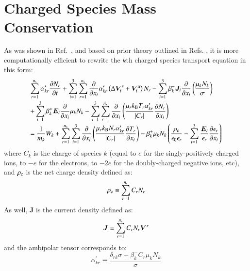 \documentclass{warpdoc}
\newcommand{\alb}{\vspace{0.1cm}\\} %
\newcommand{\mfd}{\displaystyle}
\newcommand{\ns}{{n_{\rm s}}}
\renewcommand{\vec}[1]{\bm{#1}}
\begin{document}
\section{Charged Species Mass Conservation}

As was shown in Ref.\ \cite{jcp:2015:parent}, and based on prior theory outlined in Refs. \cite{jcp:2014:parent,jcp:2011:parent:2, jcp:2013:parent}, it is more computationally efficient to rewrite the $k$th charged species transport equation in this form:
%
\begin{equation}
\begin{array}{l}\mfd
  \sum_{r=1}^{\ns} \alpha^\prime_{kr} \frac{\partial N_r}{\partial t}  
+ \sum_{i=1}^3 \sum_{r=1}^\ns  \frac{\partial}{\partial x_i}      \alpha^\prime_{kr} \left( \Delta \vec{V}_i^r + \vec{V}^{\rm n}_i \right)N_r
-  \sum_{i=1}^3 \beta_k^- \vec{J}_i \frac{\partial}{\partial x_i}  \left( \frac{\mu_k N_k}{\sigma} 
\right) \alb\mfd
+ \sum_{i=1}^3 \beta_k^+ \vec{E}_i \frac{\partial }{\partial x_i} \mu_{k} N_{k}
- \sum_{i=1}^3 \sum_{r=1}^{\ns} \frac{\partial}{\partial x_i} \left(\frac{\mu_r k_{\rm B} T_r \alpha^\prime_{kr}}{|C_r|}  \frac{\partial N_r}{\partial x_i}\right)\alb\mfd 
= \frac{1}{m_k}W_k
+ \sum_{r=1}^\ns \sum_{i=1}^3  \frac{\partial}{\partial x_i} \left( \frac{\mu_r k_{\rm B} N_r  \alpha^\prime_{kr}}{|C_r|}   \frac{\partial T_r}{\partial x_i} \right)
-\beta_k^+ \mu_{k} N_{k}\left(
  \frac{\rho_{\rm c}}{\epsilon_0\epsilon_r}
  -\sum_{i=1}^3 \frac{\vec{E}_i}{\epsilon_r} \frac{\partial \epsilon_r}{\partial x_i}  
\right)
\end{array}
\label{eqn:chargedspeciestransport}
\end{equation}
%
where   $C_k$ is the charge of species $k$ (equal to $e$ for the singly-positively charged ions, to $-e$ for the electrons, to $-2e$ for the doubly-charged negative ions, etc), and $\rho_{\rm c}$ is the net charge density defined as:
%
\begin{equation}
 \rho_{\rm c} \equiv \sum_{r=1}^\ns  C_r N_r 
\label{eqn:rhoc}
\end{equation}
%
As well, $\vec{J}$ is the current density defined as:
%
\begin{equation}
 \vec{J} \equiv \sum_{r=1}^\ns  C_r N_r  \vec{V}^r
\label{eqn:J}
\end{equation}
%
and the ambipolar tensor corresponds to:
%
\begin{equation}
\alpha_{kr}^\prime \equiv
  \frac{\delta_{rk}\sigma+ \beta_k^- C_r  \mu_k N_k}{\sigma} 
\end{equation}
%
%
\end{document}
